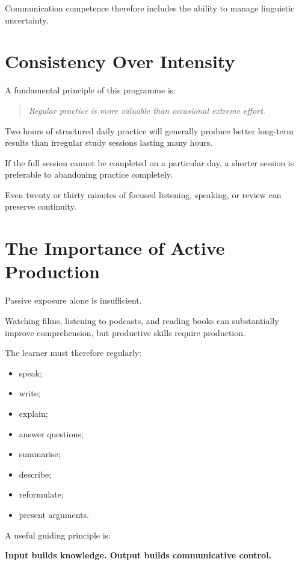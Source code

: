 Communication competence therefore includes the ability to manage linguistic uncertainty.

\section*{Consistency Over Intensity}

A fundamental principle of this programme is:

\begin{quote}
\textit{Regular practice is more valuable than occasional extreme effort.}
\end{quote}

Two hours of structured daily practice will generally produce better long-term results than irregular study sessions lasting many hours.

If the full session cannot be completed on a particular day, a shorter session is preferable to abandoning practice completely.

Even twenty or thirty minutes of focused listening, speaking, or review can preserve continuity.

\section*{The Importance of Active Production}

Passive exposure alone is insufficient.

Watching films, listening to podcasts, and reading books can substantially improve comprehension, but productive skills require production.

The learner must therefore regularly:

\begin{itemize}
    \item speak;
    \item write;
    \item explain;
    \item answer questions;
    \item summarise;
    \item describe;
    \item reformulate;
    \item present arguments.
\end{itemize}

A useful guiding principle is:

\begin{center}
\textbf{Input builds knowledge. Output builds communicative control.}
\end{center}

